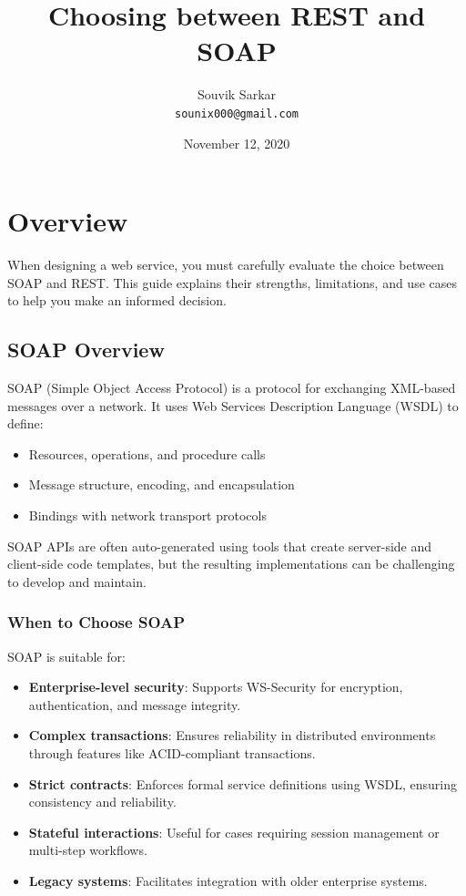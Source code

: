 \documentclass[12pt]{article}
\title{\bfseries Choosing between REST and SOAP}
\author{Souvik Sarkar \\ \texttt{sounix000@gmail.com}} %
\date{November 12, 2020}
\begin{document}
\maketitle %

\section{Overview}

When designing a web service, you must carefully evaluate the choice between SOAP and REST. This guide explains their strengths, limitations, and use cases to help you make an informed decision.

\subsection{SOAP Overview}

SOAP (Simple Object Access Protocol) is a protocol for exchanging XML-based messages over a network. It uses Web Services Description Language (WSDL) to define:

\begin{itemize}[leftmargin=1.5em]
    \item Resources, operations, and procedure calls
    \item Message structure, encoding, and encapsulation
    \item Bindings with network transport protocols
\end{itemize}

SOAP APIs are often auto-generated using tools that create server-side and client-side code templates, but the resulting implementations can be challenging to develop and maintain.

\subsubsection*{When to Choose SOAP}

SOAP is suitable for:
\begin{itemize}[leftmargin=1.5em]
    \item \textbf{Enterprise-level security}: Supports WS-Security for encryption, authentication, and message integrity.
    \item \textbf{Complex transactions}: Ensures reliability in distributed environments through features like ACID-compliant transactions.
    \item \textbf{Strict contracts}: Enforces formal service definitions using WSDL, ensuring consistency and reliability.
    \item \textbf{Stateful interactions}: Useful for cases requiring session management or multi-step workflows.
    \item \textbf{Legacy systems}: Facilitates integration with older enterprise systems.
\end{itemize}
\end{document}

